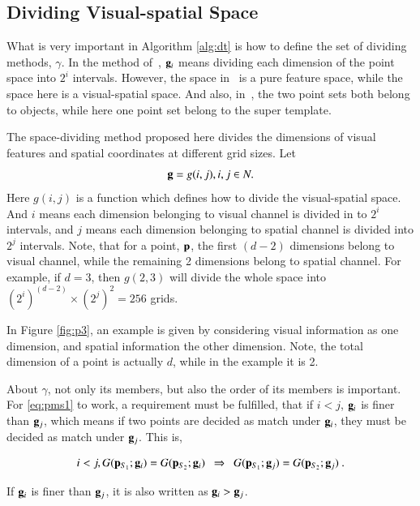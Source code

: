 \documentclass[paper]{ieice}
\begin{document}
\subsection{Dividing Visual-spatial Space}

What is very important in Algorithm \ref{alg:dt} is how to define the set of dividing methods, $\gamma$. In the method of~\cite{pmk}, ${\bf g}_i$ means dividing each dimension of the point space into $2^i$ intervals. However, the space in~\cite{pmk} is a pure feature space, while the space here is a visual-spatial space. And also, in~\cite{pmk}, the two point sets both belong to objects, while here one point set belong to the super template.

The space-dividing method proposed here divides the dimensions of visual features and spatial coordinates at different grid sizes. Let
\[{\bf g} = g(i,j),i,j \in N.\]
Here $g(i,j)$ is a function which defines how to divide the visual-spatial space. And $i$ means each dimension belonging to visual channel is divided in to $2^i$ intervals, and $j$ means each dimension belonging to spatial channel is divided into $2^j$ intervals. Note, that for a point, $\bf p$, the first $(d-2)$ dimensions belong to visual channel, while the remaining 2 dimensions belong to spatial channel. For example, if $d=3$, then $g(2,3)$ will divide the whole space into $(2^i)^{(d-2)}\times (2^j)^2=256$ grids.

In Figure \ref{fig:p3}, an example is given by considering visual information as one dimension, and spatial information the other dimension. Note, the total dimension of a point is actually $d$, while in the example it is 2.

About $\gamma$, not only its members, but also the order of its members is important. For \ref{eq:pms1} to work, a requirement must be fulfilled, that if $i<j$, ${\bf g}_i$ is finer than ${\bf g}_j$, which means if two points are decided as match under ${\bf g}_i$, they must be decided as match under ${\bf g}_j$.  This is,



\begin{equation}
i<j, G({\bf p}_{S_1};{\bf g}_i)=G({\bf p}_{S_2};{\bf g}_i)\mbox{     }\mbox{     }\Rightarrow \mbox{     }\mbox{     }G({\bf p}_{S_1};{\bf g}_j)=G({\bf p}_{S_2};{\bf g}_j)\ .
\label{eq:pms3}
\end{equation}

If ${\bf g}_i$ is finer than ${\bf g}_j$, it is also written as ${\bf g}_i>{\bf g}_j$.
\end{document}
